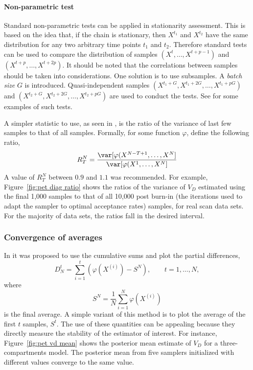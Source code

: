 


\paragraph{Non-parametric test}

Standard non-parametric tests can be applied in stationarity assessment. This
is based on the idea that, if the chain is stationary, then $X^{t_1}$ and
$X^{t_2}$ have the same distribution for any two arbitrary time points $t_1$
and $t_2$. Therefore standard tests can be used to compare the distribution of
samples $(X^t,\dots,X^{t+p-1})$ and $(X^{t+p},\dots,X^{t+2p})$. It should be
noted that the correlations between samples should be taken into
considerations. One solution is to use subsamples. A \emph{batch size} $G$ is
introduced. Quasi-independent samples
$(X^{t_1+G},X^{t_1+2G},\dots,X^{t_1+pG})$ and
$(X^{t_2+G},X^{t_2+2G},\dots,X^{t_2+pG})$ are used to conduct the tests. See
\cite[][sec.~12.2.2]{Robert:2004tn} for some examples of such tests.

A simpler statistic to use, as seen in \cite{Gelman:2011vx}, is the ratio of
the variance of last few samples to that of all samples. Formally, for some
function $\varphi$, define the following ratio,
\begin{equation}
  R_T^N = \frac{\var[\varphi(X^{N-T+1},\dots,X^{N}]}
  {\var[\varphi(X^{1},\dots,X^{N}]}
\end{equation}
A value of $R_T^N$ between $0.9$ and $1.1$ was recommended. For example,
Figure~\ref{fig:pet diag ratio} shows the ratios of the variance of $V_D$
estimated using the final 1,000 samples to that of all 10,000 post burn-in
(the iterations used to adapt the sampler to optimal acceptance rates)
samples, for real \pet scan data sets. For the majority of data sets, the
ratios fall in the desired interval.



\subsubsection{Convergence of averages}
\label{ssub:Convergence of averages}

In \cite{Yu:1998fn} it was proposed to use the cumulative sums and plot the
partial differences,
\begin{equation}
  D_N^t = \sum_{i=1}^t (\varphi(X^{(i)}) - S^N), \qquad t = 1,\dots,N,
\end{equation}
where
\begin{equation}
  S^N = \frac{1}{N}\sum_{i=1}^N \varphi(X^{(i)})
\end{equation}
is the final average. A simple variant of this method is to plot the average
of the first $t$ samples, $S^t$. The use of these quantities can be appealing
because they directly measure the stability of the estimator of interest. For
instance, Figure~\ref{fig:pet vd mean} shows the posterior mean estimate of
$V_D$ for a three-compartments \pet model. The posterior mean from five
samplers initialized with different values converge to the same value.

